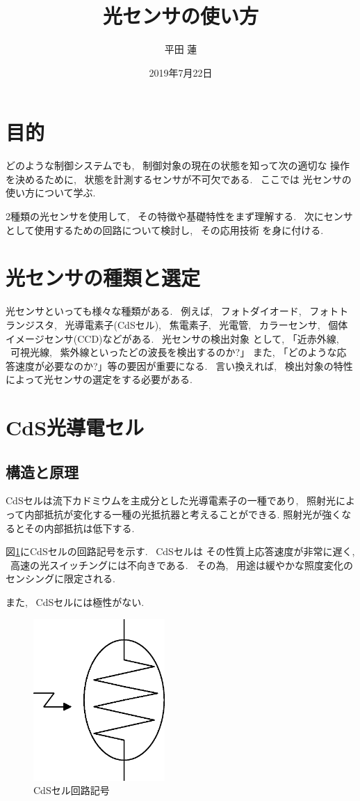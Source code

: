 \documentclass[titlepage]{jsarticle}
\title{光センサの使い方}
\author{平田 蓮}
\date{2019年7月22日}
\begin{document}
\maketitle
\section{目的}
    どのような制御システムでも, ~制御対象の現在の状態を知って次の適切な
    操作を決めるために, ~状態を計測するセンサが不可欠である. ~ここでは
    光センサの使い方について学ぶ.

    2種類の光センサを使用して, ~その特徴や基礎特性をまず理解する.
    ~次にセンサとして使用するための回路について検討し, ~その応用技術
    を身に付ける.

\section{光センサの種類と選定}
    光センサといっても様々な種類がある. ~例えば, ~フォトダイオード,
    ~フォトトランジスタ, ~光導電素子(CdSセル), ~焦電素子, ~光電管,
    ~カラーセンサ, ~個体イメージセンサ(CCD)などがある. ~光センサの検出対象
    として, 「近赤外線, ~可視光線, ~紫外線といったどの波長を検出するのか?」
    また, 「どのような応答速度が必要なのか?」等の要因が重要になる.
    ~言い換えれば, ~検出対象の特性によって光センサの選定をする必要がある.

\section{CdS光導電セル}
    \subsection{構造と原理}
        CdSセルは流下カドミウムを主成分とした光導電素子の一種であり,
        ~照射光によって内部抵抗が変化する一種の光抵抗器と考えることができる.
        照射光が強くなるとその内部抵抗は低下する.

        図\ref{fig:CdS}にCdSセルの回路記号を示す. ~CdSセルは
        その性質上応答速度が非常に遅く, ~高速の光スイッチングには不向きである.
        ~その為, ~用途は緩やかな照度変化のセンシングに限定される.
        
        また, ~CdSセルには極性がない.

        \begin{figure}[ht]
            \centering
            \includegraphics[width=5cm]{images/CdS.eps}
            \caption{CdSセル回路記号}
            \label{fig:CdS}
        \end{figure}
\end{document}
